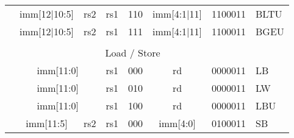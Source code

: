 \begin{table}[p]
\begin{small}
\begin{center}
\begin{tabular}{ccccccp{0.3in}p{0.3in}p{0.3in}cp{0.6in}l}
&
\multicolumn{4}{|c|}{imm[12$\vert$10:5]} &
\multicolumn{2}{c|}{rs2} &
\multicolumn{1}{c|}{rs1} &
\multicolumn{1}{c|}{110} &
\multicolumn{1}{c|}{imm[4:1$\vert$11]} &
\multicolumn{1}{c|}{1100011} & BLTU \\
\cline{2-11}
  

&
\multicolumn{4}{|c|}{imm[12$\vert$10:5]} &
\multicolumn{2}{c|}{rs2} &
\multicolumn{1}{c|}{rs1} &
\multicolumn{1}{c|}{111} &
\multicolumn{1}{c|}{imm[4:1$\vert$11]} &
\multicolumn{1}{c|}{1100011} & BGEU \\
\cline{2-11}

&
\multicolumn{10}{c}{} & \\

&
\multicolumn{10}{c}{Load / Store} & \\

\cline{2-11}
 

&
\multicolumn{6}{|c|}{imm[11:0]} &
\multicolumn{1}{c|}{rs1} &
\multicolumn{1}{c|}{000} &
\multicolumn{1}{c|}{rd} &
\multicolumn{1}{c|}{0000011} & LB \\
\cline{2-11}
  

  

&
\multicolumn{6}{|c|}{imm[11:0]} &
\multicolumn{1}{c|}{rs1} &
\multicolumn{1}{c|}{010} &
\multicolumn{1}{c|}{rd} &
\multicolumn{1}{c|}{0000011} & LW \\
\cline{2-11}
  

&
\multicolumn{6}{|c|}{imm[11:0]} &
\multicolumn{1}{c|}{rs1} &
\multicolumn{1}{c|}{100} &
\multicolumn{1}{c|}{rd} &
\multicolumn{1}{c|}{0000011} & LBU \\
\cline{2-11}
  

  

&
\multicolumn{4}{|c|}{imm[11:5]} &
\multicolumn{2}{c|}{rs2} &
\multicolumn{1}{c|}{rs1} &
\multicolumn{1}{c|}{000} &
\multicolumn{1}{c|}{imm[4:0]} &
\multicolumn{1}{c|}{0100011} & SB \\
\cline{2-11}
  

  


\end{tabular}
\end{center}
\end{small}
\end{table}
